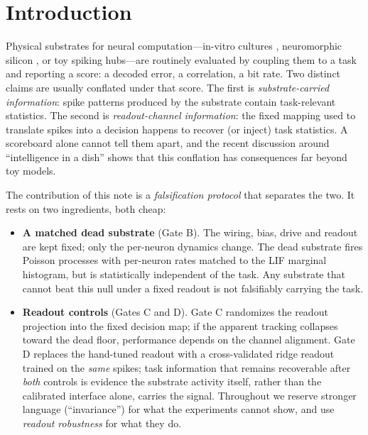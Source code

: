 \documentclass[10pt,a4paper]{article}
\begin{document}
\section{Introduction}\label{sec:intro}

Physical substrates for neural computation---in-vitro cultures
\cite{kagan2022dishbrain}, neuromorphic silicon \cite{maass1997,
lukosevicius2009}, or toy spiking hubs---are routinely evaluated by
coupling them to a task and reporting a score: a decoded error, a
correlation, a bit rate. Two distinct claims are usually conflated
under that score. The first is \emph{substrate-carried information}:
spike patterns produced by the substrate contain task-relevant
statistics. The second is \emph{readout-channel information}: the
fixed mapping used to translate spikes into a decision happens to
recover (or inject) task statistics. A scoreboard alone cannot tell
them apart, and the recent discussion around ``intelligence in a
dish'' \cite{kagan2022dishbrain,balci2023neurons,kagan2023semantics}
shows that this conflation has consequences far beyond toy models.

The contribution of this note is a \emph{falsification protocol} that
separates the two. It rests on two ingredients, both cheap:

\begin{itemize}[nosep]
\item \textbf{A matched dead substrate} (Gate B). The wiring, bias,
drive and readout are kept fixed; only the per-neuron dynamics change.
The dead substrate fires Poisson processes with per-neuron rates
matched to the LIF marginal histogram, but is statistically independent
of the task. Any substrate that cannot beat this null under a fixed
readout is not falsifiably carrying the task.
\item \textbf{Readout controls} (Gates C and D). Gate C randomizes the
readout projection into the fixed decision map; if the apparent tracking
collapses toward the dead floor, performance depends on the channel
alignment. Gate D replaces the hand-tuned readout with a
cross-validated ridge readout trained on the \emph{same} spikes; task
information that remains recoverable after \emph{both} controls is
evidence the substrate activity itself, rather than the calibrated
interface alone, carries the signal. Throughout we reserve stronger
language (``invariance'') for what the experiments cannot show, and use
\emph{readout robustness} for what they do.
\end{itemize}
\end{document}
